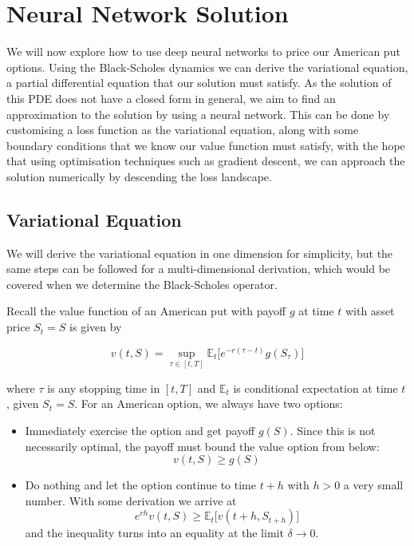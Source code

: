 \chapter{Neural Network Solution}

We will now explore how to use deep neural networks to price our American put options. Using the Black-Scholes dynamics we can derive the variational equation, a partial differential equation that our solution must satisfy. As the solution of this PDE does not have a closed form in general, we aim to find an approximation to the solution by using a neural network. This can be done by customising a loss function as the variational equation, along with some boundary conditions that we know our value function must satisfy, with the hope that using optimisation techniques such as gradient descent, we can approach the solution numerically by descending the loss landscape.

\section{Variational Equation} \label{nn_variational}

We will derive the variational equation in one dimension for simplicity, but the same steps can be followed for a multi-dimensional derivation, which would be covered when we determine the Black-Scholes operator.

Recall the value function of an American put with payoff $g$ at time $t$ with asset price $S_t = S$ is given by

$$v(t, S) = \sup_{\tau \in [t, T]} \mathbb E_t\big[e^{-r(\tau - t)}g(S_\tau)\big]$$

where $\tau$ is any stopping time in $[t, T]$ and $\mathbb E_t$ is conditional expectation at time $t$, given $S_t = S$. For an American option, we always have two options:

\begin{itemize}
    \item Immediately exercise the option and get payoff $g(S)$. Since this is not necessarily optimal, the payoff must bound the value option from below:
    $$v(t, S) \ge g(S)$$
    \item Do nothing and let the option continue to time $t + h$ with $h>0$ a very small number. With some derivation \cite{zheng2025fundamentals} we arrive at
    $$e^{rh}v(t, S) \ge \mathbb E_t \big[v(t+h, S_{t + h})\big]$$
    and the inequality turns into an equality at the limit $\delta \to 0$.
    
\end{itemize}

